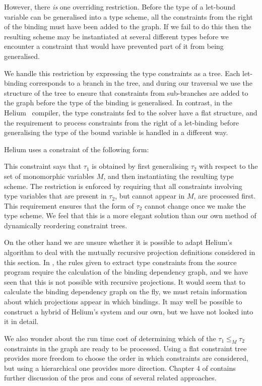 However, there \emph{is} one overriding restriction. Before the type of a let-bound variable can be generalised into a type scheme, all the constraints from the right of the binding must have been added to the graph. If we fail to do this then the resulting scheme may be instantiated at several different types before we encounter a constraint that would have prevented part of it from being generalised. 

We handle this restriction by expressing the type constraints as a tree. Each let-binding corresponds to a branch in the tree, and during our traversal we use the structure of the tree to ensure that constraints from sub-branches are added to the graph before the type of the binding is generalised. In contrast, in the Helium~\cite{heeren:constraint-type-inferencing, heeren:generalising-hm} compiler, the type constraints fed to the solver have a flat structure, and the requirement to process constraints from the right of a let-binding before generalising the type of the bound variable is handled in a different way.

Helium uses a constraint of the following form: 


This constraint says that $\tau_1$ is obtained by first generalising $\tau_2$ with respect to the set of monomorphic variables $M$, and then instantiating the resulting type scheme. The restriction is enforced by requiring that all constraints involving type variables that are present in $\tau_2$, but cannot appear in $M$, are processed first. This requirement ensures that the form of $\tau_2$ cannot change once we make the type scheme. We feel that this is a more elegant solution than our own method of dynamically reordering constraint trees. 

On the other hand we are unsure whether it is possible to adapt Helium's algorithm to deal with the mutually recursive projection definitions considered in this section. In \cite{heeren:constraint-type-inferencing}, the rules given to extract type constraints from the source program require the calculation of the binding dependency graph, and we have seen that this is not possible with recursive projections. It would seem that to calculate the binding dependency graph on the fly, we must retain information about which projections appear in which bindings. It may well be possible to construct a hybrid of Helium's system and our own, but we have not looked into it in detail.

We also wonder about the run time cost of determining which of the $\tau_1 \leq_M \tau_2$ constraints in the graph are ready to be processed. Using a flat constraint tree provides more freedom to choose the order in which constraints are considered, but using a hierarchical one provides more direction. Chapter 4 of \cite{heeren:top-quality-error-messages} contains further discussion of the pros and cons of several related approaches.

